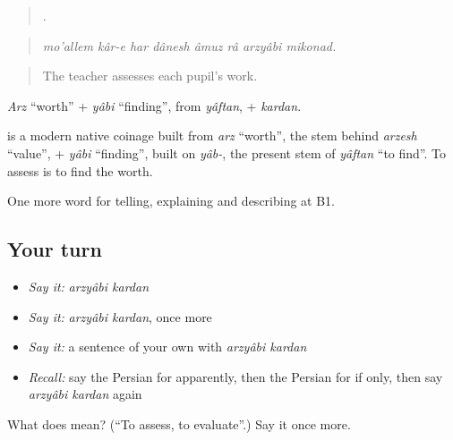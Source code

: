 \begin{quote}
       .
\end{quote}

\begin{quote}
\emph{mo'allem kâr-e har dânesh âmuz râ arzyâbi mikonad.}
\end{quote}

\begin{quote}
The teacher assesses each pupil's work.
\end{quote}

\emph{Arz} \textquotedblleft{}worth\textquotedblright{} + \emph{yâbi} \textquotedblleft{}finding\textquotedblright{}, from \emph{yâftan}, + \emph{kardan}.

\begin{cousinweb}
\textbf{} is a modern native coinage built from \emph{arz} \textquotedblleft{}worth\textquotedblright{}, the stem behind \emph{arzesh} \textquotedblleft{}value\textquotedblright{}, + \emph{yâbi} \textquotedblleft{}finding\textquotedblright{}, built on \emph{yâb-}, the present stem of \emph{yâftan} \textquotedblleft{}to find\textquotedblright{}. To assess is to find the worth.
\end{cousinweb}

\begin{grammarlens}[title={What you've built}]
One more word for telling, explaining and describing at B1.
\end{grammarlens}

\subsection*{Your turn}
\begin{itemize}
\raggedright
  \item \emph{Say it:} \emph{arzyâbi kardan}
  \item \emph{Say it:} \emph{arzyâbi kardan}, once more
  \item \emph{Say it:} a sentence of your own with \emph{arzyâbi kardan}
  \item \emph{Recall:} say the Persian for apparently, then the Persian for if only, then say \emph{arzyâbi kardan} again
\end{itemize}

\begin{tcolorbox}[breakable,colback=teal!4,colframe=teal!35!black,title={Before you move on}]
What does   mean? (\textquotedblleft{}To assess, to evaluate\textquotedblright{}.) Say it once more.
\end{tcolorbox}
